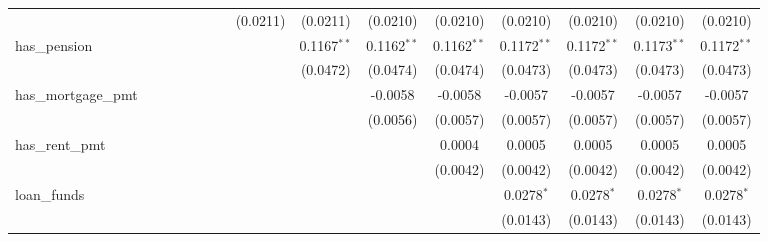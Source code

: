 \begin{table}[htbp]
\begin{tabular}{lcccccccccccccc}
                               &                 &                 &                 &                 &                 &                 & (0.0211)        & (0.0211)        & (0.0210)        & (0.0210)        & (0.0210)        & (0.0210)        & (0.0210)        & (0.0210)\\
      has\_pension            &                 &                 &                 &                 &                 &                 &                 & 0.1167$^{**}$   & 0.1162$^{**}$   & 0.1162$^{**}$   & 0.1172$^{**}$   & 0.1172$^{**}$   & 0.1173$^{**}$   & 0.1172$^{**}$\\
                               &                 &                 &                 &                 &                 &                 &                 & (0.0472)        & (0.0474)        & (0.0474)        & (0.0473)        & (0.0473)        & (0.0473)        & (0.0473)\\
      has\_mortgage\_pmt     &                 &                 &                 &                 &                 &                 &                 &                 & -0.0058         & -0.0058         & -0.0057         & -0.0057         & -0.0057         & -0.0057\\
                               &                 &                 &                 &                 &                 &                 &                 &                 & (0.0056)        & (0.0057)        & (0.0057)        & (0.0057)        & (0.0057)        & (0.0057)\\
      has\_rent\_pmt         &                 &                 &                 &                 &                 &                 &                 &                 &                 & 0.0004          & 0.0005          & 0.0005          & 0.0005          & 0.0005\\
                               &                 &                 &                 &                 &                 &                 &                 &                 &                 & (0.0042)        & (0.0042)        & (0.0042)        & (0.0042)        & (0.0042)\\
      loan\_funds             &                 &                 &                 &                 &                 &                 &                 &                 &                 &                 & 0.0278$^{*}$    & 0.0278$^{*}$    & 0.0278$^{*}$    & 0.0278$^{*}$\\
                               &                 &                 &                 &                 &                 &                 &                 &                 &                 &                 & (0.0143)        & (0.0143)        & (0.0143)        & (0.0143)\\

\end{tabular}
\end{table}
